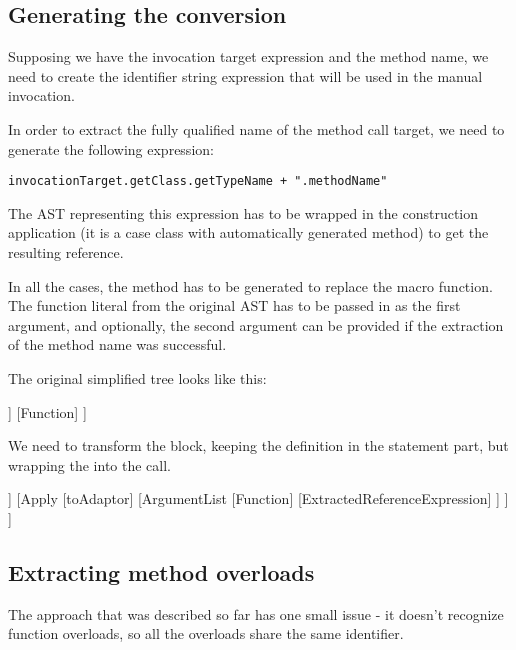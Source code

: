 \subsection{Generating the conversion}

Supposing we have the invocation target expression and the method name, we need to create the identifier string expression that will be used in the manual  invocation.

In order to extract the fully qualified name of the method call target, we need to generate the following expression:

\lstset{style=Scala}
\begin{lstlisting}
invocationTarget.getClass.getTypeName + ".methodName"
\end{lstlisting}

The AST representing this expression has to be wrapped in the  construction application (it is a case class with automatically generated  method) to get the resulting reference.

In all the cases, the  method has to be generated to replace the macro function. The function literal from the original AST has to be passed in as the first argument, and optionally, the second argument can be provided if the extraction of the method name was successful.

The original simplified tree looks like this:

\begin{forest}
	[Block
	  [Statements
	    [ValDef]
	  ]
	  [Function]
	]
\end{forest}

We need to transform the block, keeping the definition in the statement part, but wrapping the  into the  call.
	
\begin{forest}
	[Block
	[Statements
	[ValDef]
	]
	[Apply
	  [toAdaptor]
	  [ArgumentList
	    [Function]
	    [ExtractedReferenceExpression]
	  ]
	]
	]
\end{forest}

\subsection{Extracting method overloads}

The approach that was described so far has one small issue - it doesn't recognize function overloads, so all the overloads share the same identifier.

